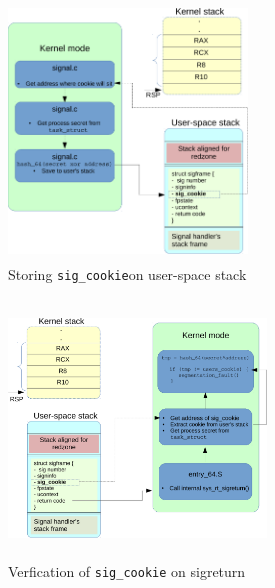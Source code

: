 \documentclass{sig-alternate-05-2015}
\begin{document}
\begin{figure}
\centering
\includegraphics[height=2.7in, width=2.5in]{6.pdf}
\caption{Storing \texttt{sig\_cookie}on user-space stack}
\label{fig:sig6}
\end{figure}

\begin{figure}
\centering
\includegraphics[height=2.7in, width=2.7in]{7.pdf}
\caption{Verfication of \texttt{sig\_cookie} on sigreturn}
\label{fig:sig7}
\end{figure}
\end{document}
